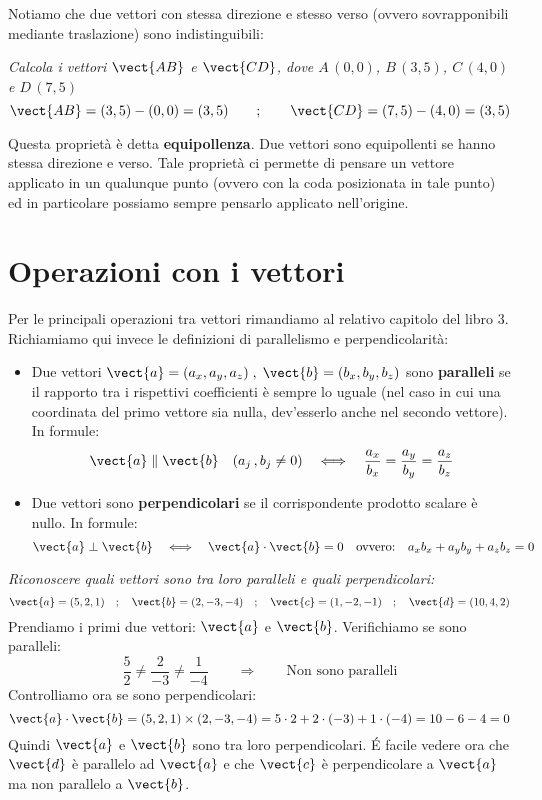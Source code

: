 Notiamo che due vettori con stessa direzione e stesso verso (ovvero sovrapponibili mediante traslazione) sono indistinguibili:
\begin{esempio}
\emph{Calcola i vettori $\vect{AB}$ e $\vect{CD}$, dove $A\,(0,0)$, $B \, (3,5)$, $C \, (4,0)$ e $D \, (7,5)$}
\[\vect{AB} = (3,5)-(0,0) = (3,5) \qquad;\qquad \vect{CD} = (7,5)-(4,0) = (3,5)\]
\end{esempio}
Questa proprietà è detta \textbf{equipollenza}. Due vettori sono equipollenti se hanno stessa direzione e verso. Tale proprietà ci permette di pensare un vettore applicato in un qualunque punto (ovvero con la coda posizionata in tale punto) ed in particolare possiamo sempre pensarlo applicato nell'origine.

\section{Operazioni con i vettori}

Per le principali operazioni tra vettori rimandiamo al relativo capitolo del libro 3. Richiamiamo qui invece le definizioni di parallelismo e perpendicolarità:
\begin{itemize}
 \item Due vettori $ \vect{a} = (a_x,a_y,a_z) \;,\; \vect{b} = (b_x,b_y,b_z)$ sono \textbf{paralleli} se il rapporto tra i rispettivi coefficienti è sempre lo uguale (nel caso in cui una coordinata del primo vettore sia nulla, dev'esserlo anche nel secondo vettore). In formule:
\[\vect{a} \parallel \vect{b} \quad (a_j\,, b_j \neq 0) \quad \Longleftrightarrow \quad \frac{a_x}{b_x} = \frac{a_y}{b_y} = \frac{a_z}{b_z}\]
\item Due vettori sono \textbf{perpendicolari} se il corrispondente prodotto scalare è nullo. In formule:
\[ \vect{a} \perp \vect{b} \quad \Longleftrightarrow\quad \vect{a} \cdot \vect{b} = 0 \quad \text{ovvero:} \quad a_xb_x+a_yb_y+a_zb_z=0\]
\end{itemize}
\begin{esempio}
 \emph{Riconoscere quali vettori sono tra loro paralleli e quali perpendicolari:}
 \[\vect{a} = (5,2,1) \quad;\quad \vect{b} = (2,-3,-4) \quad;\quad \vect{c} = (1,-2,-1)  \quad;\quad \vect{d} = (10,4,2)\]
 Prendiamo i primi due vettori: $\vect{a}$ e $\vect{b}$. Verifichiamo se sono paralleli:
 \[\frac{5}{2} \neq \frac{2}{-3} \neq \frac{1}{-4} \qquad \Rightarrow \qquad \text{Non sono paralleli}\]
 Controlliamo ora se sono perpendicolari:
 \[\vect{a} \cdot \vect{b} = (5,2,1)\times (2,-3,-4) = 5\cdot 2+2\cdot (-3)+1 \cdot (-4) = 10-6-4=0\]
 Quindi $\vect{a}$ e $\vect{b}$ sono tra loro perpendicolari. \'E facile vedere ora che $\vect{d}$ è parallelo ad $\vect{a}$ e che $\vect{c}$ è perpendicolare a $\vect{a}$ ma non parallelo a $\vect{b}$.
\end{esempio}


